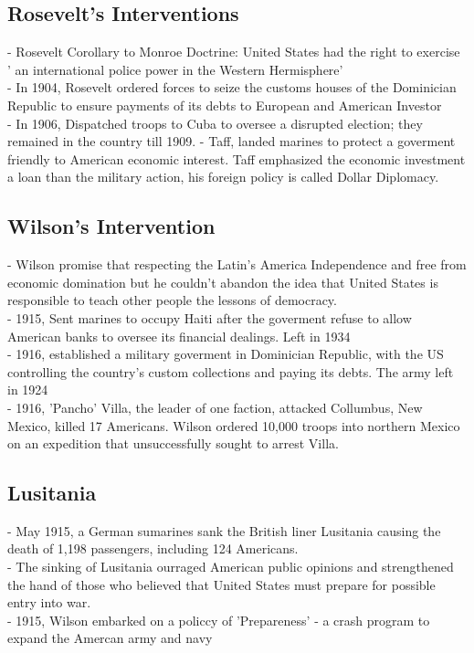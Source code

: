 \documentclass{article}
\begin{document}
\subsection{Rosevelt's Interventions}
- Rosevelt Corollary to Monroe Doctrine: United States had the right to exercise ' an international police power in the Western Hermisphere'\\
- In 1904, Rosevelt ordered forces to seize the customs houses of the Dominician Republic to ensure payments of its debts to European and American Investor\\
- In 1906, Dispatched troops to Cuba to oversee a disrupted election; they remained in the country till 1909.
- Taff, landed marines to protect a goverment friendly to American economic interest. Taff emphasized the economic investment a loan than the military action, his foreign policy is called Dollar Diplomacy.\\

\subsection{Wilson's Intervention}
- Wilson promise that respecting the Latin's America Independence and free from economic domination but he couldn't abandon the idea that United States is responsible to teach other people the lessons of democracy.\\
- 1915, Sent marines to occupy Haiti after the goverment refuse to allow American banks to oversee its financial dealings. Left in 1934\\
- 1916, established a military goverment in Dominician Republic, with the US controlling the country's custom collections and paying its debts. The army left in 1924\\
- 1916, 'Pancho' Villa, the leader of one faction, attacked Collumbus, New Mexico, killed 17 Americans. Wilson ordered 10,000 troops into northern Mexico on an expedition that unsuccessfully sought to arrest Villa.\\

\subsection{Lusitania}
- May 1915, a German sumarines sank the British liner Lusitania causing the death of 1,198 passengers, including 124 Americans.\\
- The sinking of Lusitania ourraged American public opinions and strengthened the hand of those who believed that United States must prepare for possible entry into war.\\
- 1915, Wilson embarked on a policcy of 'Prepareness' - a crash program to expand the Amercan army and navy\\
\end{document}

